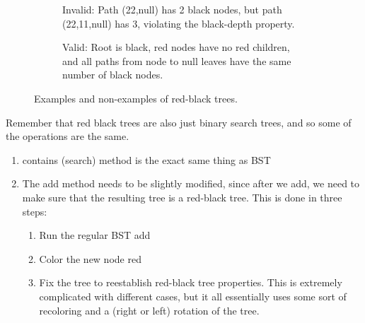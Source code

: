 \begin{definition}
\begin{figure}[H]
\begin{subfigure}[b]{0.32\textwidth}
        \caption{Invalid: Path (22,null) has 2 black nodes, but path (22,11,null) has 3, violating the black-depth property.}
        \label{fig:rb-invalid2}
      \end{subfigure}
      \hfill 
      \begin{subfigure}[b]{0.32\textwidth}
      \centering
        \caption{Valid: Root is black, red nodes have no red children, and all paths from node to null leaves have the same number of black nodes.}
        \label{fig:rb-valid}
      \end{subfigure}
      \caption{Examples and non-examples of red-black trees.}
      \label{fig:red-black-tree-examples}
    \end{figure}

    Remember that red black trees are also just binary search trees, and so some of the operations are the same.  
    \begin{enumerate}
      \item contains (search) method is the exact same thing as BST 
      \item The add method needs to be slightly modified, since after we add, we need to make sure that the resulting tree is a red-black tree. This is done in three steps: 
      \begin{enumerate}
        \item Run the regular BST add 
        \item Color the new node red 
        \item Fix the tree to reestablish red-black tree properties. This is extremely complicated with different cases, but it all essentially uses some sort of recoloring and a (right or left) rotation of the tree. 
      \end{enumerate}
    \end{enumerate}
  \end{definition}

